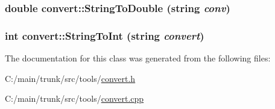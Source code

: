 \label{classconvert_a06228e8cf1a860110b210a46f9ce1eaa}
\hypertarget{classconvert_a05cb54cb7b93d0d1cc3f4102d7a61cd6}{
\subsubsection[{StringToDouble}]{\setlength{\rightskip}{0pt plus 5cm}double convert::StringToDouble (string {\em conv})}}
\label{classconvert_a05cb54cb7b93d0d1cc3f4102d7a61cd6}
\hypertarget{classconvert_abeb1bd944022811cd077260e7ea36b7a}{
\subsubsection[{StringToInt}]{\setlength{\rightskip}{0pt plus 5cm}int convert::StringToInt (string {\em convert})}}
\label{classconvert_abeb1bd944022811cd077260e7ea36b7a}


The documentation for this class was generated from the following files:\begin{DoxyCompactItemize}
\item 
C:/main/trunk/src/tools/\hyperlink{convert_8h}{convert.h}\item 
C:/main/trunk/src/tools/\hyperlink{convert_8cpp}{convert.cpp}\end{DoxyCompactItemize}
